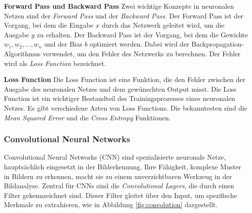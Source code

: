 \documentclass[11pt,a4paper]{article}
\begin{document}
\noindent \newline \textbf{Forward Pass und Backward Pass} \newline
Zwei wichtige Konzepte in neuronalen Netzen sind der \textit{Forward Pass} und der
\textit{Backward Pass}. Der Forward Pass ist der Vorgang, bei dem die Eingabe \(x\) durch das
Netzwerk geleitet wird, um die Ausgabe \(y\) zu erhalten. Der Backward Pass ist der Vorgang, bei
dem die Gewichte \(w_{1}, w_{2}, \dots, w_{n}\) und der Bias \(b\) optimiert werden. Dabei wird
der Backpropagation-Algorithmus verwendet, um den Fehler des Netzwerks zu berechnen. Der Fehler 
wird als \textit{Loss Function} bezeichnet.

\noindent \newline \textbf{Loss Function} \newline
Die Loss Function ist eine Funktion, die den Fehler zwischen der Ausgabe des neuronalen Netzes und
dem gewünschten Output misst. Die Loss Function ist ein wichtiger Bestandteil des Trainingsprozesses
eines neuronalen Netzes. Es gibt verschiedene Arten von Loss Functions. Die bekanntesten sind die
\textit{Mean Squared Error} und die \textit{Cross Entropy} Funktionen.


\subsubsection{Convolutional Neural Networks}
Convolutional Neural Networks (CNN) sind spezialisierte neuronale Netze, hauptsächlich eingesetzt 
in der Bilderkennung. Ihre Fähigkeit, komplexe Muster in Bildern zu erkennen, macht sie zu einem 
unverzichtbaren Werkzeug in der Bildanalyse. Zentral für CNNs sind die 
\textit{Convolutional Layers}, die durch einen Filter gekennzeichnet sind. Dieser Filter gleitet 
über den Input, um spezifische Merkmale zu extrahieren, wie in Abbildung \ref{fig:convolution} 
dargestellt.
\end{document}
